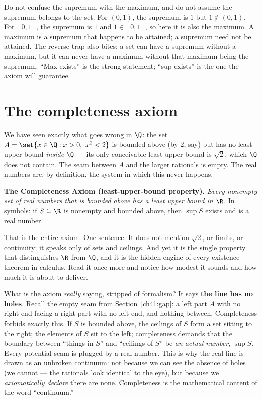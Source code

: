 \begin{trapbox}
Do not confuse the supremum with the maximum, and do not assume the supremum belongs to
the set. For $(0,1)$, the supremum is $1$ but $1\notin(0,1)$. For $[0,1]$, the supremum is
$1$ and $1\in[0,1]$, so here it is also the maximum. A maximum is a supremum that happens
to be attained; a supremum need not be attained. The reverse trap also bites: a set can
have a supremum without a maximum, but it can never have a maximum without that maximum
being the supremum. ``Max exists'' is the strong statement; ``sup exists'' is the one the
axiom will guarantee.
\end{trapbox}

\section{The completeness axiom}
\label{ch41:axiom}

We have seen exactly what goes wrong in $\Q$: the set $A = \set{x\in\Q : x>0,\ x^2<2}$ is
bounded above (by $2$, say) but has no least upper bound \emph{inside $\Q$} --- its only
conceivable least upper bound is $\sqrt 2$, which $\Q$ does not contain. The seam between
$A$ and the larger rationals is empty. The real numbers are, by definition, the system in
which this never happens.

\begin{focusbox}
\textbf{The Completeness Axiom (least-upper-bound property).}
\emph{Every nonempty set of real numbers that is bounded above has a least upper bound
in $\R$.} In symbols: if $S\subseteq\R$ is nonempty and bounded above, then $\sup S$
exists and is a real number.
\end{focusbox}

That is the entire axiom. One sentence. It does not mention $\sqrt 2$, or limits, or
continuity; it speaks only of sets and ceilings. And yet it is the single property that
distinguishes $\R$ from $\Q$, and it is the hidden engine of every existence theorem in
calculus. Read it once more and notice how modest it sounds and how much it is about to
deliver.

\begin{happeningbox}
What is the axiom \emph{really} saying, stripped of formalism? It says \textbf{the line
has no holes}. Recall the empty seam from
Section~\ref{ch41:gap}: a left part $A$ with no right end facing a right part with no left
end, and nothing between. Completeness forbids exactly this. If $S$ is bounded above, the
ceilings of $S$ form a set sitting to the right; the elements of $S$ sit to the left;
completeness demands that the boundary between ``things in $S$'' and ``ceilings of $S$''
be \emph{an actual number}, $\sup S$. Every potential seam is plugged by a real number.
This is why the real line is drawn as an unbroken continuum: not because we can see the
absence of holes (we cannot --- the rationals look identical to the eye), but because we
\emph{axiomatically declare} there are none. Completeness is the mathematical content of
the word ``continuum.''
\end{happeningbox}

